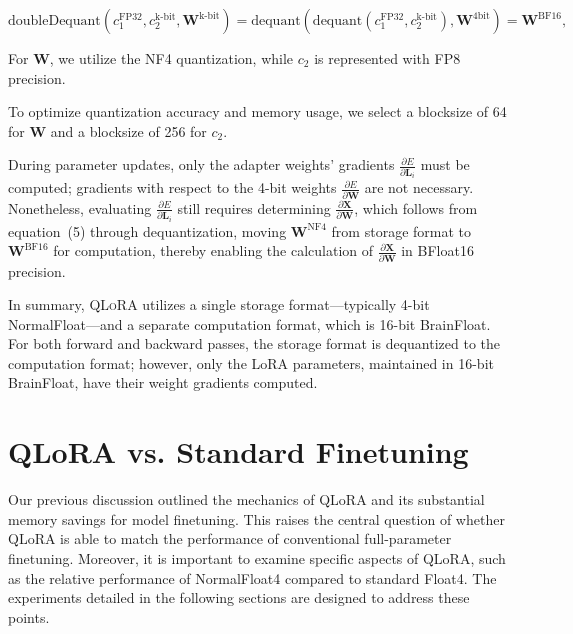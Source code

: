 \begin{equation}
    \text{doubleDequant}(c_1^{\text{FP32}}, c_2^{\text{k-bit}}, \mathbf{W}^{\text{k-bit}}) = \text{dequant}(\text{dequant}(c_1^{\text{FP32}}, c_2^{\text{k-bit}}), \mathbf{W}^{\text{4bit}}) = \mathbf{W}^{\text{BF16}},
\end{equation}

For $\mathbf{W}$, we utilize the NF4 quantization, while $c_2$ is represented with FP8 precision.

To optimize quantization accuracy and memory usage, we select a blocksize of 64 for $\mathbf{W}$ and a blocksize of 256 for $c_2$.

During parameter updates, only the adapter weights' gradients $\frac{\partial E}{\partial \mathbf{L}_i}$ must be computed; gradients with respect to the 4-bit weights $\frac{\partial E}{\partial \mathbf{W}}$ are not necessary. Nonetheless, evaluating $\frac{\partial E}{\partial \mathbf{L}_i}$ still requires determining $\frac{\partial \mathbf{X}}{\partial \mathbf{W}}$, which follows from equation~(5) through dequantization, moving $\mathbf{W}^{\text{NF4}}$ from storage format to $\mathbf{W}^{\text{BF16}}$ for computation, thereby enabling the calculation of $\frac{\partial \mathbf{X}}{\partial \mathbf{W}}$ in BFloat16 precision.

In summary, \textsc{QLoRA} utilizes a single storage format—typically 4-bit NormalFloat—and a separate computation format, which is 16-bit BrainFloat. For both forward and backward passes, the storage format is dequantized to the computation format; however, only the LoRA parameters, maintained in 16-bit BrainFloat, have their weight gradients computed.

\section{QLoRA vs. Standard Finetuning}
\label{sec:comp_to_std}

Our previous discussion outlined the mechanics of QLoRA and its substantial memory savings for model finetuning. This raises the central question of whether QLoRA is able to match the performance of conventional full-parameter finetuning. Moreover, it is important to examine specific aspects of QLoRA, such as the relative performance of NormalFloat4 compared to standard Float4. The experiments detailed in the following sections are designed to address these points.

